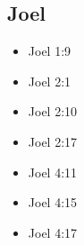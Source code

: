\documentclass[14pt]{book}
\begin{document}
														\subsection{Joel}
													\begin{multicols}{2}\begin{itemize}
																
																\item Joel 1:9
																
																\item Joel 2:1
																
																\item Joel 2:10
																
																\item Joel 2:17
																
																\item Joel 4:11
																
																\item Joel 4:15
																
																\item Joel 4:17
																
																								\end{itemize}\end{multicols}
\end{document}
